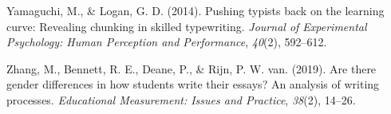 \documentclass[
  english,
  man,mask,floatsintext]{apa7}
\newlength{\cslhangindent}
\newenvironment{cslreferences}%
  {\setlength{\parindent}{0pt}%
  \everypar{\setlength{\hangindent}{\cslhangindent}}\ignorespaces}%
  {\par}
\begin{document}
\begin{cslreferences}
\leavevmode\hypertarget{ref-yamaguchi2014pushing}{}%
Yamaguchi, M., \& Logan, G. D. (2014). Pushing typists back on the learning curve: Revealing chunking in skilled typewriting. \emph{Journal of Experimental Psychology: Human Perception and Performance}, \emph{40}(2), 592--612.

\leavevmode\hypertarget{ref-zhang2019there}{}%
Zhang, M., Bennett, R. E., Deane, P., \& Rijn, P. W. van. (2019). Are there gender differences in how students write their essays? An analysis of writing processes. \emph{Educational Measurement: Issues and Practice}, \emph{38}(2), 14--26.
\end{cslreferences}
\end{document}
